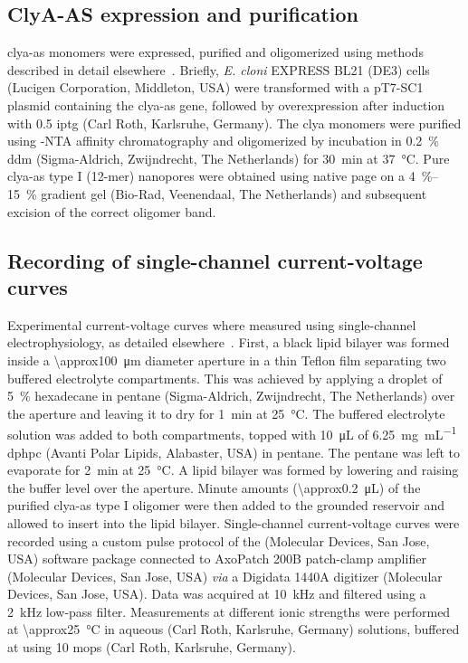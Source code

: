 \subsection{{ClyA-AS} expression and purification}
%

\Gls{clya-as} monomers were expressed, purified and oligomerized using methods described in detail
elsewhere~\cite{Soskine-2012,Soskine-2013}. Briefly, \textit{E. cloni} {EXPRESS BL21} (DE3) cells (Lucigen
Corporation, Middleton, USA) were transformed with a {pT7-SC1} plasmid containing the \gls{clya-as} gene,
followed by overexpression after induction with \SI{0.5}{\mM} \gls{iptg} (Carl Roth, Karlsruhe, Germany). The
\gls{clya} monomers were purified using -NTA affinity chromatography and oligomerized by incubation in
\SI{0.2}{\percent} \gls{ddm} (Sigma-Aldrich, Zwijndrecht, The Netherlands) for \SI{30}{\minute} at
\SI{37}{\celsius}. Pure \gls{clya-as} {type I} (12-mer) nanopores were obtained using native \gls{page} on a
\SIrange[range-phrase = --]{4}{15}{\percent} gradient gel (Bio-Rad, Veenendaal, The Netherlands) and
subsequent excision of the correct oligomer band.

\subsection{Recording of single-channel current-voltage curves}
%

Experimental current-voltage curves where measured using single-channel electrophysiology, as detailed
elsewhere~\cite{Maglia-2010,Soskine-2012,Soskine-2013}. First, a black lipid bilayer was formed inside a
\SI{\approx100}{\um} diameter aperture in a thin Teflon film separating two buffered electrolyte compartments.
This was achieved by applying a droplet of \SI{5}{\percent} hexadecane in pentane (Sigma-Aldrich, Zwijndrecht,
The Netherlands) over the aperture and leaving it to dry for \SI{1}{\minute} at \SI{25}{\celsius}. The
buffered electrolyte solution was added to both compartments, topped with \SI{10}{\uL} of
\SI{6.25}{\milli\gram\per\milli\liter} \gls{dphpc} (Avanti Polar Lipids, Alabaster, USA) in pentane. The
pentane was left to evaporate for \SI{2}{\minute} at \SI{25}{\celsius}. A lipid bilayer was formed by lowering
and raising the buffer level over the aperture. Minute amounts (\SI{\approx0.2}{\uL}) of the purified
\gls{clya-as} {type I} oligomer were then added to the grounded \cisi{} reservoir and allowed to insert into
the lipid bilayer. Single-channel current-voltage curves were recorded using a custom pulse protocol of the
 (Molecular Devices, San Jose, USA) software package connected to AxoPatch 200B patch-clamp
amplifier (Molecular Devices, San Jose, USA) \textit{via} a Digidata 1440A digitizer (Molecular Devices, San
Jose, USA). Data was acquired at \SI{10}{\kHz} and filtered using a \SI{2}{\kHz} low-pass filter. Measurements
at different ionic strengths were performed at \SI{\approx25}{\celsius} in aqueous  (Carl Roth,
Karlsruhe, Germany) solutions, buffered at  using \SI{10}{\mM} \gls{mops} (Carl Roth, Karlsruhe,
Germany).


\cleardoublepage

